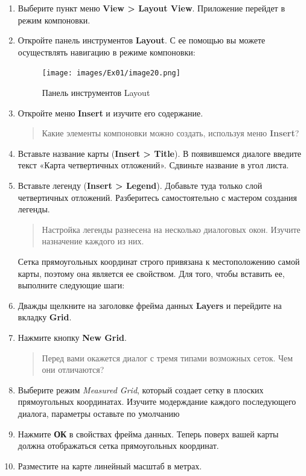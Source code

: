 \documentclass[12pt,]{book}
\begin{document}
\begin{enumerate}
\def\labelenumi{\arabic{enumi}.}
\item
  Выберите пункт меню \textbf{View \textgreater{} Layout View}. Приложение перейдет в режим компоновки.
\item
  Откройте панель инструментов \textbf{Layout}. С ее помощью вы можете осуществлять навигацию в режиме компоновки:

  \begin{figure}
  \centering
  \texttt{[image: images/Ex01/image20.png]}
  \caption{Панель инструментов Layout}
  \end{figure}
\item
  Откройте меню \textbf{Insert} и изучите его содержание.

  \begin{quote}
  Какие элементы компоновки можно создать, используя меню \textbf{Insert}?
  \end{quote}
\item
  Вставьте название карты (\textbf{Insert \textgreater{} Title}). В появившемся диалоге введите текст «Карта четвертичных отложений». Сдвиньте название в угол листа.
\item
  Вставьте легенду (\textbf{Insert \textgreater{} Legend}). Добавьте туда только слой четвертичных отложений. Разберитесь самостоятельно с мастером создания легенды.

  \begin{quote}
  Настройка легенды разнесена на несколько диалоговых окон. Изучите назначение каждого из них.
  \end{quote}

  Сетка прямоугольных координат строго привязана к местоположению самой карты, поэтому она является ее свойством. Для того, чтобы вставить ее, выполните следующие шаги:
\item
  Дважды щелкните на заголовке фрейма данных \textbf{Layers} и перейдите на вкладку \textbf{Grid}.
\item
  Нажмите кнопку \textbf{New Grid}.

  \begin{quote}
  Перед вами окажется диалог с тремя типами возможных сеток. Чем они отличаются?
  \end{quote}
\item
  Выберите режим \emph{Measured Grid}, который создает сетку в плоских прямоугольных координатах. Изучите модерждание каждого последующего диалога, параметры оставьте по умолчанию
\item
  Нажмите \textbf{ОК} в свойствах фрейма данных. Теперь поверх вашей карты должна отображаться сетка прямоугольных координат.
\item
  Разместите на карте линейный масштаб в метрах.
\end{enumerate}
\end{document}
